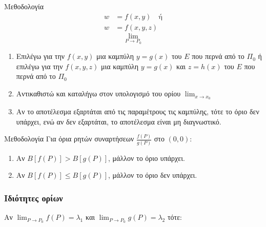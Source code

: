 \documentclass[11pt,a4paper,titlepage]{article}
\begin{document}
\begin{infobox}{Μεθοδολογία}
\begin{align*}
w&=f(x,y) \quad \text{ή}\\
w&=f(x,y,z)
\end{align*}
\[ \lim_{P\to P_0} \]
\tcblower
\begin{enumerate}
\item Επιλέγω για την \(f(x,y)\) μια καμπύλη \(y=g(x)\) του \(Ε\) που περνά από το \(Π_0\) ή \\ επιλέγω για την \(f(x,y,z)\) μια καμπύλη \(y=g(x)\) και \(z=h(x)\) του \(Ε\) που περνά από το \(Π_0\)
\item Αντικαθιστώ και καταλήγω στον υπολογισμό του ορίου \(\lim_{x \to x_0}\)
\item Αν το αποτέλεσμα εξαρτάται από τις παραμέτρους τις καμπύλης, τότε το όριο δεν υπάρχει, ενώ αν δεν εξαρτάται, το αποτέλεσμα είναι μη διαγνωστικό.
\end{enumerate}
\end{infobox}

\begin{infobox}{Μεθοδολογία}
Για όρια ρητών συναρτήσεων \(\frac{f(P)}{g(P)}\) στο \((0,0)\):
\tcblower
\begin{enumerate}
\item Αν \(B \left[ f(P) \right] > B \left[ g(P) \right]\), μάλλον το όριο υπάρχει.
\item Αν \(B \left[ f(P) \right] \leq B \left[ g(P) \right]\), μάλλον το όριο δεν υπάρχει.
\end{enumerate}
\end{infobox}

\subsubsection{Ιδιότητες ορίων}

Αν \( \lim_{P \to P_0} f(P) = \lambda_1\) και \( \lim_{P \to P_0} g(P) = \lambda_2\) τότε:
\end{document}
